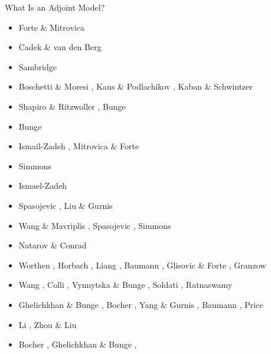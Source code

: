 What Is an Adjoint Model? \cite{erri97}

\begin{scriptsize}
\begin{itemize}
\item[\nineteenninetysix] Forte \& Mitrovica \cite{fomi96} 
\item[\nineteenninetyeight] Cadek \& van den Berg \cite{cava98}
\item[\nineteenninetynine] Sambridge \cite{samb99,samb99b}
\item[\twothousandone] Boschetti \& Moresi \cite{bomo01}, Kaus \& Podlachikov \cite{kapo01}, 
                       Kaban \& Schwintzer \cite{kasc01}
\item[\twothousandtwo] Shapiro \& Ritzwoller \cite{shri02}, Bunge \etal \cite{burb02}
\item[\twothousandthree] Bunge \etal \cite{buht03}
\item[\twothousandfour] Ismail-Zadeh \etal \cite{isst04}, Mitrovica \& Forte \cite{mifo04}
\item[\twothousandsixteen] Simmons \etal \cite{sifg06}
\item[\twothousandseven] Ismael-Zadeh \etal \cite{isks07}
\item[\twothousandeight] Spasojevic \etal \cite{splg08}, Liu \& Gurnis \cite{ligu08}
\item[\twothousandnine] Wang \& Mavriplis \cite{wama09}, Spasojevic \etal \cite{splg09},
                        Simmons \etal \cite{sifg09}
\item[\twothousandtwelve] Natarov \& Conrad \cite{naco12}
\item[\twothousandfourteen] Worthen \etal \cite{wosp14}, Horbach \etal \cite{hobo14},
                            Liang \etal \cite{licl14}, Baumann \etal \cite{bakp14},
                            Glisovic \& Forte \cite{glfo14}, Granzow \cite{gran14}
\item[\twothousandfifteen] Wang \etal \cite{wahg15}, Colli \etal \cite{cobs15},
                           Vynnytska \& Bunge \cite{vybu15}, Soldati \etal \cite{sobd15},
                           Ratnaswamy \etal \cite{rasg15}
\item[\twothousandsixteen] Ghelichkhan \& Bunge \cite{ghbu16}, Bocher \etal \cite{bocf16},
                           Yang \& Gurnis \cite{yagu16}, Baumann \cite{baum16},
                           Price \cite{pric16}
\item[\twothousandseventeen] Li \etal \cite{ligs17}, Zhou \& Liu \cite{zhli17}
\item[\twothousandeighteen] Bocher \etal \cite{bofc18}, Ghelichkhan \& Bunge \cite{ghbu18}, 

\end{itemize}
\end{scriptsize}
